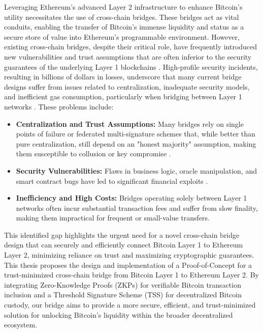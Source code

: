 \documentclass{DESSThesis}
\begin{document}
Leveraging Ethereum's advanced Layer 2 infrastructure to enhance Bitcoin's utility necessitates the use of cross-chain bridges. These bridges act as vital conduits, enabling the transfer of Bitcoin's immense liquidity and status as a secure store of value into Ethereum's programmable environment. However, existing cross-chain bridges, despite their critical role, have frequently introduced new vulnerabilities and trust assumptions that are often inferior to the security guarantees of the underlying Layer 1 blockchains \cite{notland_sok_2024}. High-profile security incidents, resulting in billions of dollars in losses, underscore that many current bridge designs suffer from issues related to centralization, inadequate security models, and inefficient gas consumption, particularly when bridging between Layer 1 networks \cite{belenkov_sok_2025}. These problems include:
\begin{itemize}
    \item \textbf{Centralization and Trust Assumptions:} Many bridges rely on single points of failure or federated multi-signature schemes that, while better than pure centralization, still depend on an "honest majority" assumption, making them susceptible to collusion or key compromise \cite{notland_sok_2024}.
    \item \textbf{Security Vulnerabilities:} Flaws in business logic, oracle manipulation, and smart contract bugs have led to significant financial exploits \cite{wu_safeguarding_2024}.
    \item \textbf{Inefficiency and High Costs:} Bridges operating solely between Layer 1 networks often incur substantial transaction fees and suffer from slow finality, making them impractical for frequent or small-value transfers.
\end{itemize}

This identified gap highlights the urgent need for a novel cross-chain bridge design that can securely and efficiently connect Bitcoin Layer 1 to Ethereum Layer 2, minimizing reliance on trust and maximizing cryptographic guarantees. This thesis proposes the design and implementation of a Proof-of-Concept for a trust-minimized cross-chain bridge from Bitcoin Layer 1 to Ethereum Layer 2. By integrating Zero-Knowledge Proofs (ZKPs) for verifiable Bitcoin transaction inclusion and a Threshold Signature Scheme (TSS) for decentralized Bitcoin custody, our bridge aims to provide a more secure, efficient, and trust-minimized solution for unlocking Bitcoin's liquidity within the broader decentralized ecosystem.
\end{document}
